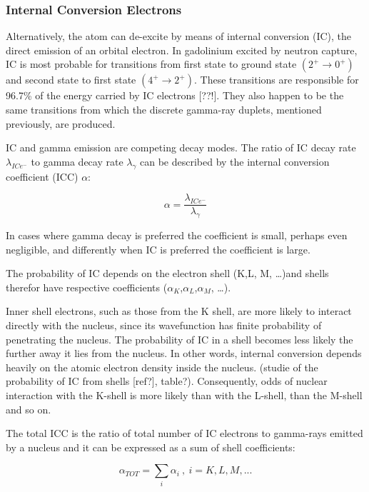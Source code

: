 \subsubsection{Internal Conversion Electrons}
Alternatively, the atom can de-excite by means of internal conversion (IC), the direct emission of an orbital electron. In gadolinium excited by neutron capture, IC is most probable for transitions from first state to ground state $(2^+ \rightarrow 0^+)$ and second state to first state $(4^+ \rightarrow 2^+)$. These transitions are responsible for 96.7\% of the energy carried by IC electrons [??!]. They also happen to be the same transitions from which the discrete gamma-ray duplets, mentioned previously, are produced.

IC and gamma emission are competing decay modes. The ratio of IC decay rate $\lambda_{ICe^-}$ to gamma decay rate $\lambda_{\gamma}$ can be described by the internal conversion coefficient (ICC) $\alpha$:

  \begin{equation}
      \alpha =  \frac{\lambda_{ICe^-}}{\lambda_{\gamma}}
  \end{equation}

In cases where gamma decay is preferred the coefficient is small, perhaps even negligible, and differently when IC is preferred the coefficient is large.

The probability of IC depends on the electron shell (K,L, M, …)and shells therefor have respective coefficients ($\alpha_K$,$\alpha_L$,$\alpha_M$, …).

Inner shell electrons, such as those from the K shell, are more likely to interact directly with the nucleus, since its wavefunction has finite probability of penetrating the nucleus. The probability of IC in a shell becomes less likely the further away it lies from the nucleus. In other words, internal conversion depends heavily on the atomic electron density inside the nucleus. (studie of the probability of IC from shells [ref?], table?). Consequently, odds of nuclear interaction with the K-shell is more likely than with the L-shell, than the M-shell and so on.

The total ICC is the ratio of total number of IC electrons to gamma-rays emitted by a nucleus and it can be expressed as a sum of shell coefficients:

\begin{equation}
    \alpha_{TOT} =  \sum_i \alpha_i \ , \ i = K, L, M, ...
\end{equation}

